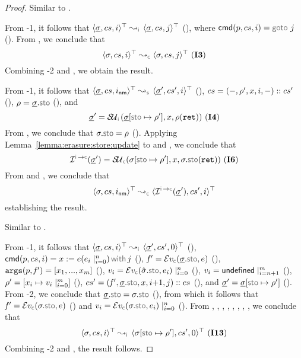 \begin{proof}
 
\noindent {} Similar to . 
\vspace{5pt}

 
\noindent {} From \hyp{1}, it follows that $\abssemrule{\istate, \cs, i}{\istate, \cs, j}{\top}{\top}{\instrumented}$ (),   
where $\ccmd[\prog][\cs]{i} = \goto \, j$ (). 
From , we conclude that 
$$\abssemrule{\jstate, \cs, i}{\jstate, \cs, j}{\top}{\top}{\concrete} \text{ (\ieq{3})}$$
Combining \hyp{2} and , we obtain the result. 
 \vspace{5pt}
 
 
\noindent {}
From \hyp{1}, it follows that $\abssemrule{\istate, \cs, \retlab}{\istate', \cs', i}{\top}{\top}{\symbolic}$ (), 
$cs = (-, \rho', x, i, -) :: cs'$ (), $\store = \istate.\stosel$ (), 
and 
$$\istate' = \stupdt{\instrumented}(\istate[\stosel \mapsto \store'], \jvar, \store(\retvar)) \text{ (\ieq{4})}$$
From , we conclude that $\jstate.\stosel = \store$ (). 
Applying Lemma~\ref{lemma:erasure:store:update} to  and , we conclude that 
$$
\interpret{\instconc}{}(\istate') = \stupdt{\concrete}(\jstate[\stosel \mapsto \store'], \jvar, \jstate.\stosel(\retvar)) 
 \text{ (\ieq{6})}
$$ 
From  and , we conclude that 
$$\abssemrule{\jstate, \cs, \retlab}{\interpret{\instconc}{}(\istate'), \cs', i}{\top}{\top}{\concrete}$$ 
establishing the result. 
 \vspace{5pt}

\noindent {}
Similar to . 
 \vspace{5pt}
 
 
\noindent {}
From \hyp{1}, it follows that $\abssemrule{\istate, \cs, i}{\istate', \cs', 0}{\top}{\top}{\instrumented}$ (), 
$\ccmd[\prog][\cs]{i} =\jsilcall{\jvar}{\jsilexpr}{\jsilexpr_i \mid_{i = 0}^{n}}{j}$ (), 
$\pid' = \evalexpr{\concrete}(\istate.\stosel, \jsilexpr)$ (), 
$\mathtt{args}(p, \mathit{f}') = [ x_1, ..., x_{m} ]$ (), 
$\val_i = \evalexpr{\concrete}(\sstate.\stosel, \jsilexpr_i) \mid_{i = 0}^{n}$ (), 
$v_i = {\sf undefined} \mid_{i = n+1}^{m}$ (), 
$\rho' = [x_i \mapsto v_i \mid_{i = 0}^{m}]$ (),  
$\cs' = (\pid', \istate.\stosel, \jvar, i{+}1, j) :: \cs$ (), and 
$\istate' = \istate[\stosel \mapsto \store']$ (). 
From \hyp{2}, we conclude that $\istate.\stosel = \jstate.\stosel$ (), from 
which it follows that 
$\pid' = \evalexpr{\concrete}(\jstate.\stosel, \jsilexpr)$ ()
and 
$\val_i = \evalexpr{\concrete}(\jstate.\stosel, \jsilexpr_i) \mid_{i = 0}^{n}$ (). 
From , , , , , , , , we conclude that 
$$
 \abssemrule{\jstate, \cs, i}{\jstate[\stosel \mapsto \store'], \cs', 0}{\top}{\top}{\instrumented} \text{ (\ieq{13})}
$$
Combining \hyp{2} and , the result follows. 
\vspace{5pt}



\end{proof}
